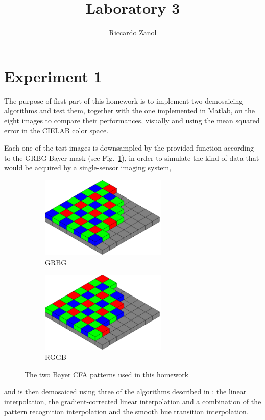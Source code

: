 \documentclass[a4paper,oneside]{article}
\author{Riccardo Zanol}
\title{Laboratory 3}
\begin{document}
\matlabcodeconfig
\maketitle
\section*{Experiment 1}
The purpose of first part of this homework is to implement two
demosaicing algorithms and test them, together with the one
implemented in Matlab, on the eight images 
to compare their performances, visually and using the mean squared
error in the CIELAB color space.

Each one of the test images is downsampled by the provided function
 according to the GRBG Bayer mask (see
Fig.~\ref{fig:bayer_grbg}), in order to simulate the kind of data that
would be acquired by a single-sensor imaging system,
\begin{figure}[htbp]
  \centering
  \begin{subfigure}{0.5\textwidth}
    \centering
    \includegraphics[width=0.66\textwidth]{include_imgs/bayer_grbg}
    \caption{GRBG}
    \label{fig:bayer_grbg}
  \end{subfigure}%
  \begin{subfigure}{0.5\textwidth}
    \centering
    \includegraphics[width=0.66\textwidth]{include_imgs/bayer_rggb}
    \caption{RGGB}
    \label{fig:bayer_rggb}
  \end{subfigure}
  \caption{The two Bayer CFA patterns used in this homework}
\end{figure}
and is then demosaiced using three of the algorithms described in
\cite{demosaic_alg}: the linear interpolation, the gradient-corrected
linear interpolation and a combination of the pattern recognition
interpolation and the smooth hue transition interpolation.
\end{document}

